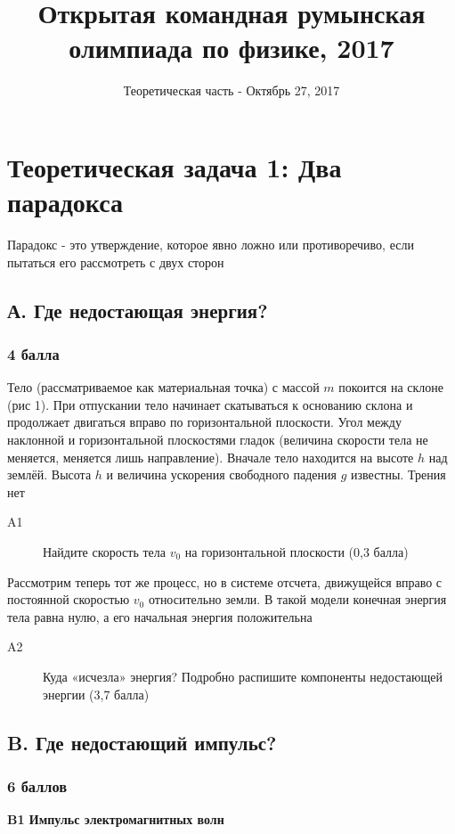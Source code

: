 \documentclass[a4paper, 14pt]{article}
\title{Открытая командная румынская олимпиада по физике, 2017}
\date{Теоретическая часть - Октябрь 27, 2017}
\begin{document}
    
    \maketitle
    
    \section*{Теоретическая задача 1: Два парадокса}
    Парадокс - это утверждение, которое явно ложно или противоречиво, если пытаться его рассмотреть с двух сторон
    \subsection*{А. Где недостающая энергия?}
    \subsubsection*{4 балла}
    Тело (рассматриваемое как материальная точка) с массой $m$ покоится на склоне (рис 1).
    При отпускании тело начинает скатываться к основанию склона и продолжает двигаться вправо по горизонтальной
    плоскости.
    Угол между наклонной и горизонтальной плоскостями гладок (величина скорости тела не меняется, меняется лишь
    направление).
    Вначале тело находится на высоте $h$ над землёй.
    Высота $h$ и величина ускорения свободного падения $g$ известны.
    Трения нет
    
    \begin{description}
        \item [A1]
        Найдите скорость тела $v_0$ на горизонтальной плоскости (0,3 балла)
    \end{description}
    
    Рассмотрим теперь тот же процесс, но в системе отсчета, движущейся вправо с постоянной скоростью $v_0$
    относительно земли.
    В такой модели конечная энергия тела равна нулю, а его начальная энергия положительна
    
    \begin{description}
        \item [A2] Куда «исчезла» энергия?
        Подробно распишите компоненты недостающей энергии (3,7 балла)
    \end{description}
    
    \subsection*{B. Где недостающий импульс?}
    \subsubsection*{6 баллов}
    \textbf{B1 Импульс электромагнитных волн}
    
\end{document}
